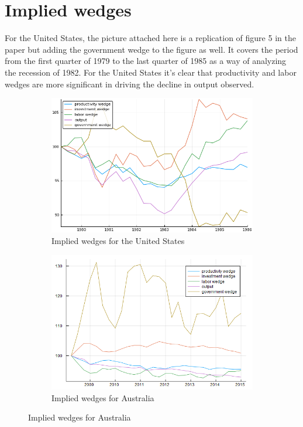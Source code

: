 \documentclass{article} %
\begin{document}
\section*{Implied wedges}
%
For the United States, the picture attached here is a replication of figure 5 in the paper but adding the government wedge to the figure as well. It covers the period from the first quarter of 1979 to the last quarter of 1985 as a way of analyzing the recession of 1982. For the United States it's clear that productivity and labor wedges are more significant in driving the decline in output observed. 
%
\begin{figure}[h!]
  \centering
  \begin{subfigure}[b]{0.45\textwidth}
  \includegraphics[width=\textwidth]{../USA/us_wedges.png}
  \caption{Implied wedges for the United States}
\end{subfigure}
\begin{subfigure}[b]{0.45\textwidth}
  \includegraphics[width=\textwidth]{../AUS/wedges.png}
  \caption{Implied wedges for Australia}  
  \end{subfigure}
\end{figure}
\end{document}
